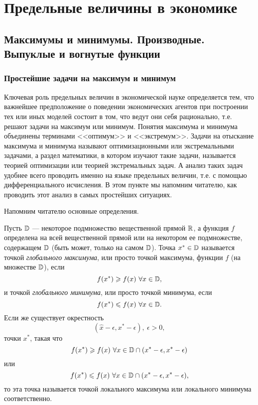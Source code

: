 



\chapter{Предельные величины в экономике}

\section{ Максимумы и минимумы. Производные. Выпуклые и вогнутые функции}


\subsection{Простейшие задачи на максимум и минимум}


    Ключевая роль предельных величин в экономической науке определяется тем,
    что важнейшее предположение о поведении экономических агентов при построении
    тех или иных моделей  состоит в том, что ведут они себя рационально,  т.е.
    решают задачи на максимум или минимум. Понятия максимума и минимума
    объединены терминами <<оптимум>> и <<экстремум>>. Задачи на отыскание максимума
    и минимума называют оптимизационными или экстремальными
    задачами, а раздел математики, в котором
    изучают такие задачи, называется теорией оптимизации или теорией
    экстремальных задач.
    А анализ таких задач удобнее всего
    проводить именно на языке предельных величин, т.е. с помощью
    дифференциального исчисления. В этом пункте мы напомним
    читателю, как проводить этот анализ в самых простейших ситуациях.



    Напомним читателю основные определения.

    Пусть $\mathbb{D}$ --- некоторое подмножество вещественной прямой
    $\mathbb{R}$, а функция $f$ определена на
    всей вещественной прямой или на некотором ее подмножестве,
    содержащем $\mathbb{D}$ (быть может, только на самом $\mathbb{D}$).
    Точка $x^{*}\in \mathbb{D}$ называется точкой \emph{глобального
    максимума}, или просто точкой максимума, функции
     $f$ (на множестве $\mathbb{D}$), если
    \[f(x^{*})\geqslant f(x) \ \forall x\in\mathbb{D},\]
    и точкой \emph{глобального минимума}, или просто точкой минимума, если
     \[f(x^{*})\leqslant f(x) \ \forall x\in\mathbb{D}.\]
     Если же существует  окрестность
     \[(\hat{x}-\epsilon,x^{*}-\epsilon), \  \epsilon>0,\]
     точки $x^{*}$, такая что
     \[f(x^{*})\geqslant f(x) \ \forall x\in\mathbb{D}\cap(x^{*}-\epsilon,x^{*}-\epsilon)\]
     или
     \[f(x^{*})\leqslant f(x) \ \forall x\in\mathbb{D}\cap(x^{*}-\epsilon,x^{*}-\epsilon),\]
     то эта точка называется точкой локального максимума или локального
     минимума соответственно.


